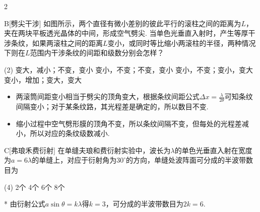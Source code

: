 \begin{paracol}{2}
    \begin{choice}{B}[劈尖干涉]
        如图所示，两个直径有微小差别的彼此平行的滚柱之间的距离为$L$，夹在两块平板透光晶体的中间，形成空气劈尖. 当单色光垂直入射时，产生等厚干涉条纹，如果两滚柱之间的距离$L$变小，或同时等比缩小两滚柱的半径，两种情况下则在$L$范围内干涉条纹的间距和级数分别会怎样？
        \begin{tasks}(2)
            \task 变大，减小；不变，变小
            \task 变小，不变；不变，变小
            \task 变小，不变；变小，变大
            \task 变小，增加；变大，变大
        \end{tasks}
    \end{choice}
    \switchcolumn\centering
    \vfill
    \vfill
\end{paracol}
\begin{solution}
\begin{itemize}
    \item 两滚筒间距变小相当于劈尖的顶角变大，根据条纹间距公式$\Delta x=\frac{\lambda}{2\theta}$可知条纹间隔变小；对于某条纹路，其光程差是确定的，所以数目不变.
    \item 缩小过程中空气劈形膜的顶角不变，所以条纹间隔不变，但每处的光程差减小，所以对应的条纹级数减小.
\end{itemize}
\end{solution}

\begin{choice}{C}[弗琅禾费衍射]
    在单缝夫琅和费衍射实验中，波长为$\lambda$的单色光垂直入射在宽度为$a=6\lambda$的单缝上，对应于衍射角为$30^{\circ}$的方向，单缝处波阵面可分成的半波带数目为
    \begin{tasks}(4)
        \task\color{normalcolor} 2个
        \task\color{normalcolor} 4个
        \task\color{normalcolor} 6个
        \task\color{normalcolor} 8个
    \end{tasks}
\end{choice}
\begin{solution}*
    由衍射公式$a\sin{\theta}=k\lambda$得$k=3$，可分成的半波带数目为$2k=6$.
\end{solution}

